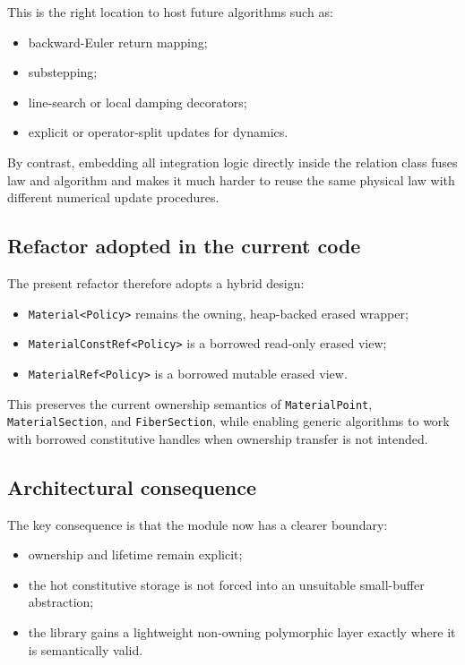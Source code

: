 This is the right location to host future algorithms such as:
\begin{itemize}
  \item backward-Euler return mapping;
  \item substepping;
  \item line-search or local damping decorators;
  \item explicit or operator-split updates for dynamics.
\end{itemize}

By contrast, embedding all integration logic directly inside the relation class
fuses law and algorithm and makes it much harder to reuse the same physical law
with different numerical update procedures.

\subsection{Refactor adopted in the current code}

The present refactor therefore adopts a hybrid design:
\begin{itemize}
  \item \texttt{Material<Policy>} remains the owning, heap-backed erased
        wrapper;
  \item \texttt{MaterialConstRef<Policy>} is a borrowed read-only erased view;
  \item \texttt{MaterialRef<Policy>} is a borrowed mutable erased view.
\end{itemize}

This preserves the current ownership semantics of \texttt{MaterialPoint},
\texttt{MaterialSection}, and \texttt{FiberSection}, while enabling generic
algorithms to work with borrowed constitutive handles when ownership transfer
is not intended.

\subsection{Architectural consequence}

The key consequence is that the module now has a clearer boundary:
\begin{itemize}
  \item ownership and lifetime remain explicit;
  \item the hot constitutive storage is not forced into an unsuitable
        small-buffer abstraction;
  \item the library gains a lightweight non-owning polymorphic layer exactly
        where it is semantically valid.
\end{itemize}

